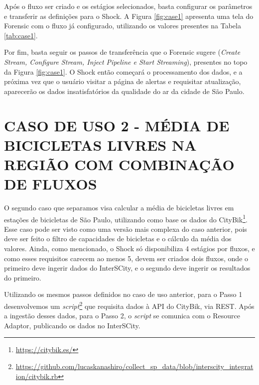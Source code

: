 Após o fluxo ser criado e os estágios selecionados, basta
configurar os parâmetros e transferir as definições para o Shock. A Figura
\ref{fig:case1} apresenta uma tela do Forensic com o fluxo já
configurado, utilizando os valores presentes na Tabela \ref{tab:case1}.

Por fim, basta seguir os passos de transferência que o Forensic sugere (\textit{Create
Stream, Configure Stream, Inject Pipeline e Start Streaming}), presentes no
topo da Figura \ref{fig:case1}. O Shock então começará o processamento dos
dados, e a próxima vez que o usuário visitar a página de alertas e requisitar
atualização, aparecerão os dados insatisfatórios da qualidade do ar da cidade
de São Paulo.

\section{CASO DE USO 2 - MÉDIA DE BICICLETAS LIVRES NA REGIÃO COM COMBINAÇÃO DE
FLUXOS}

O segundo caso que separamos visa calcular a média de bicicletas livres em estações
de bicicletas de São Paulo, utilizando como base os dados do
CityBik\footnote{\url{https://citybik.es/}}. Esse caso pode ser visto como uma
versão mais complexa do caso anterior, pois deve ser feito o filtro de
capacidades de bicicletas e o cálculo da média dos valores. Ainda,
como mencionado, o Shock só disponibiliza 4 estágios por
fluxos, e como esses requisitos carecem ao menos 5, devem ser criados
dois fluxos, onde o primeiro deve ingerir dados do InterSCity, e o
segundo deve ingerir os resultados do primeiro.

Utilizando os mesmos passos definidos no caso de uso anterior, para o Passo 1
desenvolvemos um
\textit{script}\footnote{\url{https://github.com/lucaskanashiro/collect_sp_data/blob/interscity_integration/citybik.rb}}
que requisita dados à API do CityBik, via REST. Após a ingestão desses dados,
para o Passo 2, o \textit{script} se comunica com o Resource Adaptor,
publicando os dados no InterSCity.

